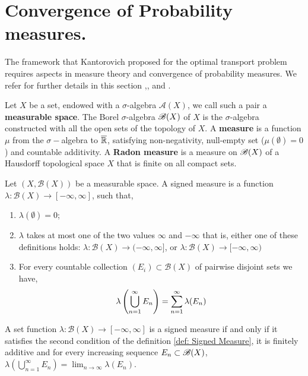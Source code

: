 


\section{Convergence of Probability measures.}

The framework that Kantorovich proposed for the optimal transport problem requires aspects in measure theory and convergence of probability measures. We refer for further details in this section \cite{Donald2013MeasureTheory},\cite{Patrick1999ConverProbMeas}, \cite{Fonseca2007ModCalculculusofVar} and \cite{Milan2000TpicsWeakconvProbs}.

Let $X$ be a set, endowed with a $\sigma$-algebra $\mathscr{A}(X)$, we call such a pair a \textbf{measurable space}. The Borel $\sigma$-algebra $\mathscr{B}(X)$ of $X$ is the $\sigma$-algebra constructed with all the open sets of the topology of $X$. A \textbf{measure} is a function $\mu$ from the $\sigma-$algebra to $\overline{\mathbb{R}}$, satisfying non-negativity, null-empty set ($\mu(\emptyset)=0$) and countable additivity. A \textbf{Radon measure} is a measure on $\mathscr{B}(X)$ of a Hausdorff topological space $X$ that is finite on all compact sets.
\begin{definition}
	Let $(X, \mathscr{B}(X))$ be a measurable space. A signed measure is a function $\lambda:\mathscr{B}(X)\to[-\infty, \infty]$, such that,
	\begin{enumerate}
		\item $\lambda(\emptyset)=0$;
		\item $\lambda$ takes at most one of the two values $\infty$ and $-\infty$ that is, either one of these definitions holds:  $\lambda:\mathscr{B}(X)\to(-\infty, \infty]$, or
		$\lambda:\mathscr{B}(X)\to[-\infty, \infty)$ 
		\item For every countable collection $(E_i)\subset \mathscr{B}(X)$ of pairwise disjoint sets we have,
		\begin{equation}
			\lambda\left( \bigcup_{n=1}^{\infty}E_n \right)=\sum_{n=1}^{\infty}\lambda(E_n)
		\end{equation}
	\end{enumerate}
	\label{def: Signed Measure}
\end{definition}
A set function $\lambda:\mathscr{B}(X)\to [-\infty, \infty]$ is a signed measure if and only if it satisfies the second condition of the definition \ref{def: Signed Measure}, it is finitely additive and for every increasing sequence $E_n\subset\mathscr{B}(X)$, $\lambda(\bigcup_{n=1}^\infty E_n)=\lim_{n\rightarrow \infty} \lambda(E_n)$.


